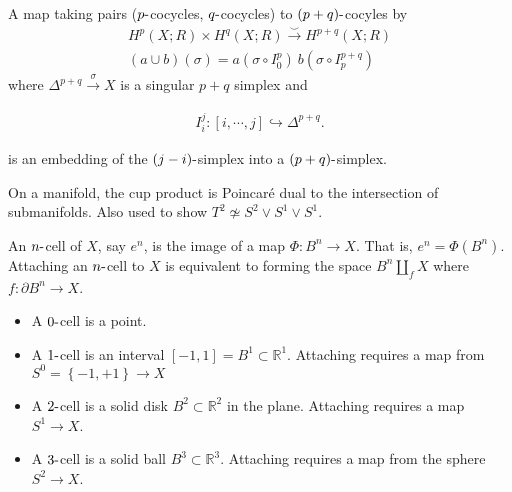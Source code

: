 \begin{definition}

A map taking pairs (\(p{\hbox{-}}\)cocycles, \(q{\hbox{-}}\)cocycles) to
\((p+q){\hbox{-}}\)cocyles by
\begin{align*}
H^p(X; R) \times H^q(X; R) \xrightarrow{\smile} H^{p+q}(X; R)\\
(a \cup b)(\sigma) = a(\sigma \circ I_{0}^p)~b(\sigma \circ I_{p}^{p+q})
\end{align*}
where \(\Delta^{p+q} \xrightarrow{\sigma} X\) is a singular \(p+q\)
simplex and

\begin{align*}I_{i}^j: [i, \cdots, j] \hookrightarrow\Delta^{p+q}
.\end{align*}

is an embedding of the \((j-i){\hbox{-}}\)simplex into a
\((p+q){\hbox{-}}\)simplex.

\end{definition}

\begin{example}

On a manifold, the cup product is Poincaré dual to the intersection of
submanifolds. Also used to show
\(T^2 \not\simeq S^2 \vee S^1 \vee S^1\).

\end{example}

\begin{definition}[CW Complex]

\end{definition}


\begin{definition}[CW Cell]

An \(n{\hbox{-}}\)cell of \(X\), say \(e^n\), is the image of a map
\(\Phi: B^n \to X\). That is, \(e^n = \Phi(B^n)\). Attaching an
\(n{\hbox{-}}\)cell to \(X\) is equivalent to forming the space
\(B^n \coprod_{f} X\) where \(f: {\partial}B^n \to X\).

\begin{itemize}
\tightlist
\item
  A \(0{\hbox{-}}\)cell is a point.
\item
  A \(1{\hbox{-}}\)cell is an interval
  \([-1, 1] = B^1 \subset {\mathbb{R}}^1\). Attaching requires a map
  from \(S^0 =\left\{{-1, +1}\right\} \to X\)
\item
  A \(2{\hbox{-}}\)cell is a solid disk \(B^2 \subset {\mathbb{R}}^2\)
  in the plane. Attaching requires a map \(S^1 \to X\).
\item
  A \(3{\hbox{-}}\)cell is a solid ball \(B^3 \subset {\mathbb{R}}^3\).
  Attaching requires a map from the sphere \(S^2 \to X\).
\end{itemize}

\end{definition}

